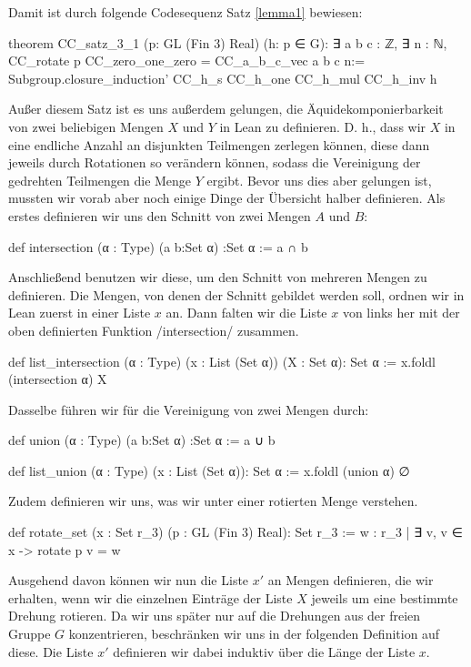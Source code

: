 \documentclass[10pt]{article}
\begin{document}
\noindent Damit ist durch folgende Codesequenz Satz \ref{lemma1} bewiesen:
\begin{leancode}
theorem CC_satz_3_1 (p: GL (Fin 3) Real) (h: p ∈ G):
       ∃ a b c : ℤ, ∃ n : ℕ, CC_rotate p CC_zero_one_zero = CC_a_b_c_vec a b c n:=
  Subgroup.closure_induction' CC_h_s CC_h_one CC_h_mul CC_h_inv h
\end{leancode}

\noindent Außer diesem Satz ist es uns außerdem gelungen, die Äquidekomponierbarkeit von zwei beliebigen Mengen $X$ und $Y$ in Lean zu definieren. D. h., dass wir $X$ in eine endliche Anzahl an disjunkten Teilmengen zerlegen können, diese dann jeweils durch Rotationen so verändern können, sodass die Vereinigung der gedrehten Teilmengen die Menge $Y$ ergibt. Bevor uns dies aber gelungen ist, mussten wir vorab aber noch einige Dinge der Übersicht halber definieren. Als erstes definieren wir uns den Schnitt von zwei Mengen $A$ und $B$:
\begin{leancode}
def intersection (α : Type) (a b:Set α) :Set α := a ∩ b
\end{leancode}
\noindent Anschließend benutzen wir diese, um den Schnitt von mehreren Mengen zu definieren. Die Mengen, von denen der Schnitt gebildet werden soll, ordnen wir in Lean zuerst in einer Liste $x$ an. Dann falten wir die Liste $x$ von links her mit der oben definierten Funktion \lean/intersection/ zusammen.
\begin{leancode}
def list_intersection (α : Type) (x : List (Set α)) (X : Set α): Set α :=
  x.foldl (intersection α) X
\end{leancode}
\noindent Dasselbe führen wir für die Vereinigung von zwei Mengen durch:
\begin{leancode}
def union (α : Type) (a b:Set α) :Set α := a ∪ b

def list_union (α : Type) (x : List (Set α)): Set α :=
  x.foldl (union α) ∅
\end{leancode}
\noindent Zudem definieren wir uns, was wir unter einer rotierten Menge verstehen.
\begin{leancode}
def rotate_set (x : Set r_3) (p : GL (Fin 3) Real): Set r_3 :=
  {w : r_3  | ∃ v, v ∈ x -> rotate p v = w}
\end{leancode}
\noindent Ausgehend davon können wir nun die Liste $x'$ an Mengen definieren, die wir erhalten, wenn wir die einzelnen Einträge der Liste $X$ jeweils um eine bestimmte Drehung rotieren. Da wir uns später nur auf die Drehungen aus der freien Gruppe $G$ konzentrieren, beschränken wir uns in der folgenden Definition auf diese. Die Liste $x'$ definieren wir dabei induktiv über die Länge der Liste $x$.
\end{document}
